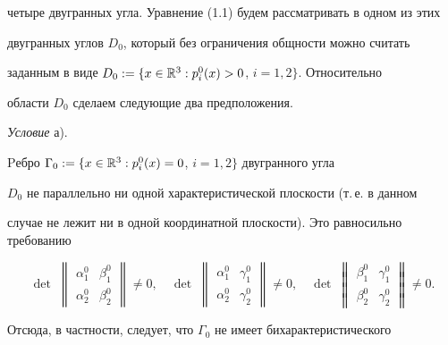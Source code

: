 четыре двугранных угла. Уравнение (1.1) будем рассматривать в одном из этих


двугранных углов $D_0$, который без ограничения общности можно считать


заданным в виде $D_0:=\{x \in \Bbb{R}^3:p_i^0(x)>0$, $i=1,2\}$. Относительно


области $D_0$ сделаем следующие два предположения.





{\it Условие} а).


Pебро $\Gamma_0:=\{x\in \Bbb{R}^3:p_i^0(x)=0$, $i=1,2\}$ двугранного угла


$D_0$ не параллельно ни одной характеристической плоскости (т.\,е. в данном


случае не лежит ни в одной координатной плоскости). Это равносильно требованию




\begin{equation}


\det\;


\begin{Vmatrix}


\alpha_1^0  &  \beta_1^0  \\


\alpha_2^0  &  \beta_2^0


\end{Vmatrix}\neq 0,\quad


\det\;


\begin{Vmatrix}


\alpha_1^0  &  \gamma_1^0  \\


\alpha_2^0  &  \gamma_2^0


\end{Vmatrix}\neq 0,\quad


\det\;


\begin{Vmatrix}


\beta_1^0  &  \gamma_1^0  \\


\beta_2^0  &  \gamma_2^0


\end{Vmatrix}\neq 0.


\end{equation}


Отсюда, в частности, следует, что $\Gamma_0$ не имеет бихарактеристического


